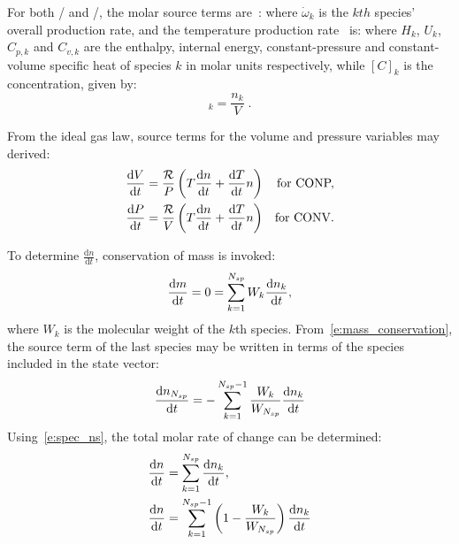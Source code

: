 \documentclass[12pt,number,sort&compress]{elsarticle}
\begin{document}
For both \conp/ and \conv/, the molar source terms are~\cite{TurnsStephenR2012Aitc}:
where $\dot{\omega}_k$ is the $kth$ species' overall production rate, and the temperature production rate~\cite{TurnsStephenR2012Aitc} is:
where $H_k$, $U_k$, $C_{p,k}$ and $C_{v, k}$ are the enthalpy, internal energy, constant-pressure and constant-volume specific heat of species $k$ in molar units respectively, while $[C]_{k}$ is the concentration, given by:
\begin{equation}
 [C]_{k} = \frac{n_{k}}{V}\;\text{.}
\end{equation}

From the ideal gas law, source terms for the volume and pressure variables may derived:
\begin{subequations}
\label{e:param_incomplete}
\begin{align}
\frac{\text{d} V }{\text{d} t } &= \frac{\Ru/}{P} \left(T \frac{\text{d} n }{\text{d} t } + \frac{\text{d} T }{\text{d} t } n\right) & \text{\dconp/,} \\
\frac{\text{d} P }{\text{d} t } &= \frac{\Ru/}{V} \left(T \frac{\text{d} n }{\text{d} t } + \frac{\text{d} T }{\text{d} t } n\right) & \text{\dconv/.}
\end{align}
\end{subequations}

To determine $\frac{\text{d} n }{\text{d} t }$, conservation of mass is invoked:
\begin{equation}
 \label{e:mass_conservation}
 \frac{\text{d} m }{\text{d} t } = 0 = \sum_{k=1}^{\ns/}  W_{k} \frac{\text{d} n_{k} }{\text{d} t },
\end{equation}
where $W_{k}$ is the molecular weight of the $k$th species.
From~\cref{e:mass_conservation}, the source term of the last species may be written in terms of the species included in the state vector:
\begin{equation}
 \frac{\text{d} n_{\ns/} }{\text{d} t } = - \sum_{k=1}^{\ns/ - 1} \frac{W_{k}}{W_{\ns/}} \frac{\text{d} n_{k} }{\text{d} t }
 \label{e:spec_ns}
\end{equation}
Using~\cref{e:spec_ns}, the total molar rate of change can be determined:
\begin{align}
\frac{\text{d} n }{\text{d} t } &= \sum_{k=1}^{\ns/} \frac{\text{d} n_{k} }{\text{d} t }, \nonumber \\
\frac{\text{d} n }{\text{d} t } &= \sum_{k=1}^{\ns/ - 1} \left(1 - \frac{W_{k}}{W_{\ns/}}\right) \frac{\text{d} n_{k} }{\text{d} t }
\label{e:total_molar}
\end{align}
\end{document}

